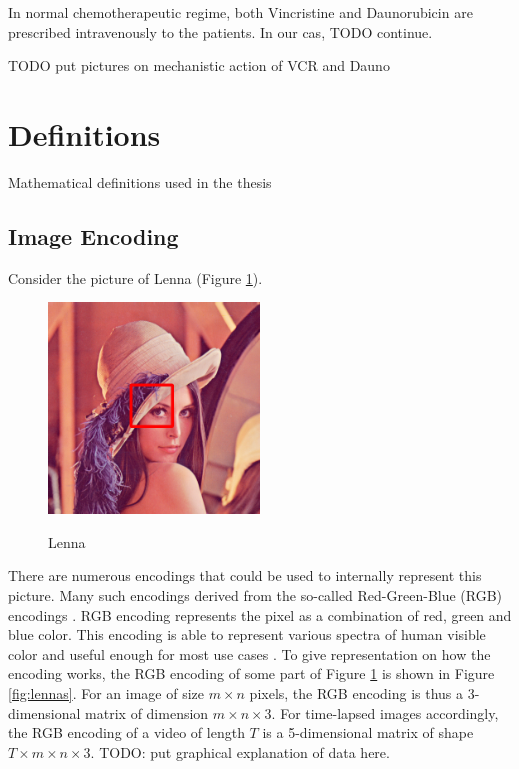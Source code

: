 \documentclass[pdftex,12pt,a4paper]{report}
\begin{document}
In normal chemotherapeutic regime, both Vincristine and Daunorubicin are prescribed intravenously to the patients. In our cas, TODO continue.

TODO put pictures on mechanistic action of VCR and Dauno

\section{Definitions}

Mathematical definitions used in the thesis

\subsection{Image Encoding}

Consider the picture of Lenna (Figure \ref{fig:lennasample}).

\begin{figure}[h]
\centering
\includegraphics[width=0.5\textwidth]{images/lenna_marked}
\label{fig:lennasample}
\caption{Lenna}
\end{figure}

There are numerous encodings that could be used to internally represent this picture. Many such encodings derived from the so-called Red-Green-Blue (RGB) encodings \cite{sonka2014image}. RGB encoding represents the pixel as a combination of red, green and blue color. This encoding is able to represent various spectra of human visible color and useful enough for most use cases \cite{sonka2014image, jayant1993signal}. To give representation on how the encoding works, the RGB encoding of some part of Figure \ref{fig:lennasample} is shown in Figure \ref{fig:lennas}. For an image of size $m \times n$ pixels, the RGB encoding is thus a 3-dimensional matrix of dimension $m \times n \times 3$. For time-lapsed images accordingly, the RGB encoding of a video of length $T$ is a 5-dimensional matrix of shape $T \times m \times n \times 3$. TODO: put graphical explanation of data here.
\end{document}
